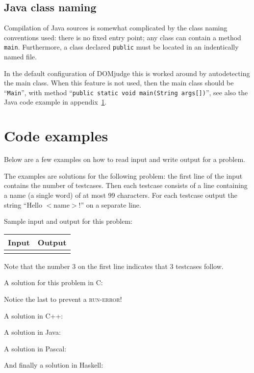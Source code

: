\subsection{Java class naming}

Compilation of Java sources is somewhat complicated by the class
naming conventions used: there is no fixed entry point; any class can
contain a method \texttt{main}. Furthermore, a class declared
\texttt{public} must be located in an indentically named file.

In the default configuration of DOMjudge this is worked around by
autodetecting the main class. When this feature is not used, then
the main class should be ``\verb!Main!'', with method
``\verb!public static void main(String args[])!'', see also the Java
code example in appendix~\ref{codeexamples}.

\newpage
\appendix

\section{Code examples}\label{codeexamples}

Below are a few examples on how to read input and write output for a
problem.

The examples are solutions for the following problem: the first line
of the input contains the number of testcases. Then each testcase
consists of a line containing a name (a single word) of at most 99
characters. For each testcase output the string ``Hello $<$name$>$!''
on a separate line.

Sample input and output for this problem:

\begin{tabular}{|p{}|p{}|}
\hline
\textbf{Input} & \textbf{Output} \\
\hline
 &
 \\
\hline
\end{tabular}

Note that the number 3 on the first line indicates that 3 testcases
follow.

A solution for this problem in C:

Notice the last  to prevent a \textsc{run-error}!

\newpage

A solution in C++:

A solution in Java:

\newpage

A solution in Pascal:

And finally a solution in Haskell:


